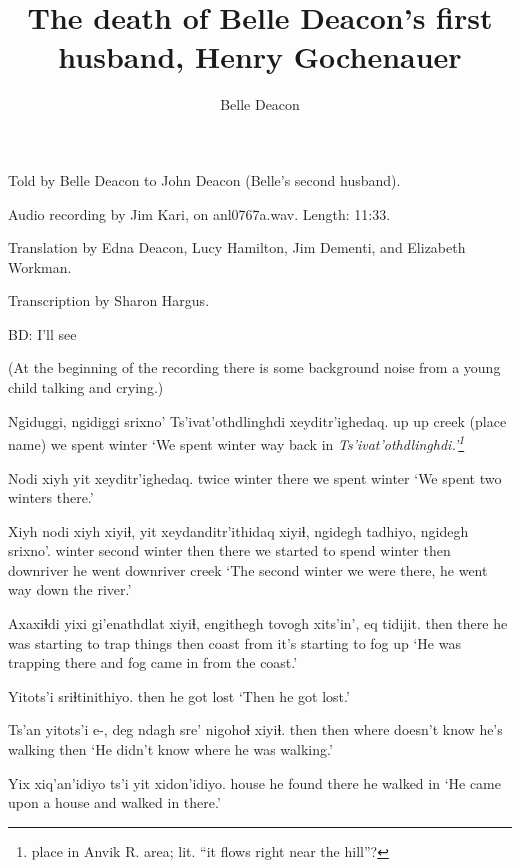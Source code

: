 \documentclass[12pt]{article}
\begin{document}
\title{The death of Belle Deacon's first husband, Henry Gochenauer}
\author{Belle Deacon}
\date{}
\maketitle

Told by Belle Deacon to John Deacon (Belle's second husband).

Audio recording by Jim Kari, on anl0767a.wav.  Length:  11:33.

Translation by Edna Deacon, Lucy Hamilton, Jim Dementi, and Elizabeth Workman.

Transcription by Sharon Hargus.

BD:  I'll see

(At the beginning of the recording there is some background noise from a young child talking and crying.)

\gll Ngiduggi, ngidiggi srixno' Ts'ivat'othdlinghdi xeyditr'ighedaq.
up up creek             {(place name)}        {we spent winter}
\glt `We spent winter way back in \em Ts'ivat'othdlinghdi\em .'\footnote{place in Anvik R. area; lit. ``it flows right near the hill''?}
\glend

\gll Nodi xiyh yit xeyditr'ighedaq.
twice  winter there {we spent winter}
\glt `We spent two winters there.'
\glend

\gll Xiyh nodi xiyh xiyiɬ, yit {xeydanditr'ithidaq xiyiɬ,}        ngidegh tadhiyo, ngidegh srixno'.
winter second winter then there {we started to spend winter} then {downriver} {he went} downriver creek
\glt `The second winter we were there, he went way down the river.'
\glend

\gll Axaxiɬdi yixi gi'enathdlat xiyiɬ, {engithegh tovogh} xits'in', {eq tidijit}.
then there {he was starting to trap things} then coast           from     {it's starting to fog up}
\glt `He was trapping there and fog came in from the coast.'
\glend

\gll Yitots'i sriɬtinithiyo.
then {he got lost}
\glt `Then he got lost.'
\glend

\gll Ts'an yitots'i e-, {deg ndagh} sre'     nigohoɬ xiyiɬ. 
then  then     {}  where  {doesn't know} {he's walking} then
\glt `He didn't know where he was walking.'
\glend

\gll Yix xiq'an'idiyo ts'i yit xidon'idiyo. 
house {he found} {} there {he walked in}
\glt `He came upon a house and walked in there.'
\glend
\end{document}

